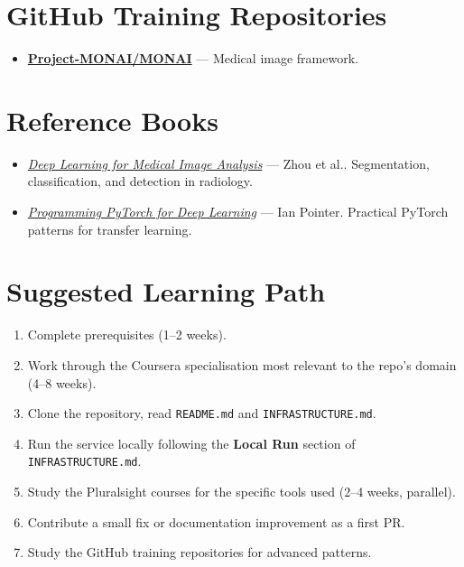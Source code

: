 \documentclass[11pt,a4paper]{article}
\begin{document}
\section{GitHub Training Repositories}
\begin{itemize}[leftmargin=1.5em]
  \item \href{https://github.com/Project-MONAI/MONAI}{\textbf{Project-MONAI/MONAI}} — Medical image framework.
\end{itemize}

\section{Reference Books}
\begin{itemize}[leftmargin=1.5em]
  \item \href{https://www.elsevier.com/books/deep-learning-for-medical-image-analysis/zhou/978-0-12-810408-8}{\textit{Deep Learning for Medical Image Analysis}} — Zhou et al.. Segmentation, classification, and detection in radiology.
  \item \href{https://www.oreilly.com/library/view/programming-pytorch-for/9781492045342/}{\textit{Programming PyTorch for Deep Learning}} — Ian Pointer. Practical PyTorch patterns for transfer learning.
\end{itemize}

\section{Suggested Learning Path}
\begin{enumerate}
  \item Complete prerequisites (1--2 weeks).
  \item Work through the Coursera specialisation most relevant to the repo's domain (4--8 weeks).
  \item Clone the repository, read \texttt{README.md} and \texttt{INFRASTRUCTURE.md}.
  \item Run the service locally following the \textbf{Local Run} section of \texttt{INFRASTRUCTURE.md}.
  \item Study the Pluralsight courses for the specific tools used (2--4 weeks, parallel).
  \item Contribute a small fix or documentation improvement as a first PR.
  \item Study the GitHub training repositories for advanced patterns.
\end{enumerate}
\end{document}
